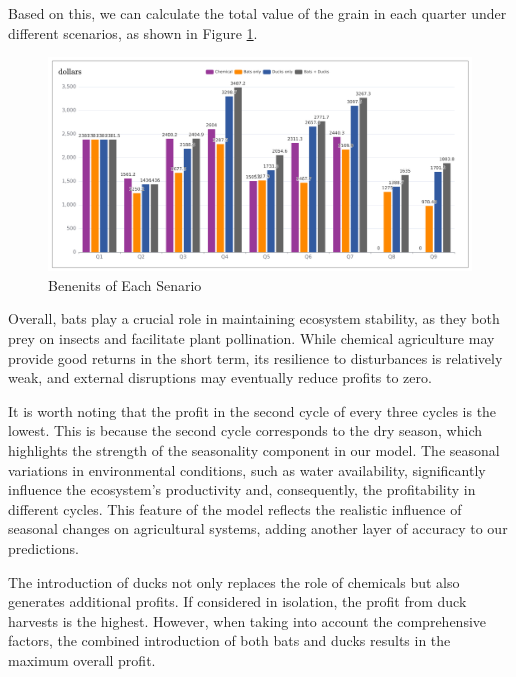 \documentclass{HZNUMCM}
\begin{document}
        Based on this, we can calculate the total value of the grain in each quarter under different scenarios, 
        as shown in Figure \ref{fig:Benefits}.
        \begin{figure}
          \centering
          \includegraphics[width=\linewidth]{images/benefits_processed.png}
          \caption{Benenits of Each Senario}
          \label{fig:Benefits}
        \end{figure}
        Overall, bats play a crucial role in maintaining ecosystem stability, 
        as they both prey on insects and facilitate plant pollination. 
        While chemical agriculture may provide good returns in the short term, 
        its resilience to disturbances is relatively weak, 
        and external disruptions may eventually reduce profits to zero. 

        It is worth noting that the profit in the second cycle of every three cycles is the lowest. This is because the second cycle corresponds to the dry season, which highlights the strength of the seasonality component in our model. The seasonal variations in environmental conditions, such as water availability, significantly influence the ecosystem's productivity and, consequently, the profitability in different cycles. This feature of the model reflects the realistic influence of seasonal changes on agricultural systems, adding another layer of accuracy to our predictions.

        The introduction of ducks not only replaces the role of chemicals but also generates additional profits. 
        If considered in isolation, the profit from duck harvests is the highest. 
        However, when taking into account the comprehensive factors, 
        the combined introduction of both bats and ducks results in the maximum overall profit.
        
\end{document}
